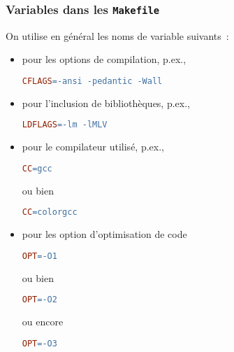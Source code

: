 \begin{frame}[fragile]
\frametitle{Variables dans les {\tt Makefile}}
On utilise en général les noms de variable suivants~:
\begin{itemize}
    \item {} pour les options de compilation, p.ex.,
\begin{lstlisting}[language=make,numbers=none,basicstyle=\footnotesize\tt]
CFLAGS=-ansi -pedantic -Wall
\end{lstlisting}

    \item {} pour l'inclusion de bibliothèques, p.ex.,
\begin{lstlisting}[language=make,numbers=none,basicstyle=\footnotesize\tt]
LDFLAGS=-lm -lMLV
\end{lstlisting}

    \item {} pour le compilateur utilisé, p.ex.,

\begin{minipage}[c]{.16\textwidth}
\begin{lstlisting}[language=make,numbers=none,basicstyle=\footnotesize\tt]
CC=gcc
\end{lstlisting}
\end{minipage}
ou bien \hspace{2.5em}
\begin{minipage}[c]{.16\textwidth}
\begin{lstlisting}[language=make,numbers=none,basicstyle=\footnotesize\tt]
CC=colorgcc
\end{lstlisting}
\end{minipage}

    \item {} pour les option d'optimisation de code

\begin{minipage}[c]{.16\textwidth}
\begin{lstlisting}[language=make,numbers=none,basicstyle=\footnotesize\tt]
OPT=-O1
\end{lstlisting}
\end{minipage}
ou bien \hspace{2.5em}
\begin{minipage}[c]{.16\textwidth}
\begin{lstlisting}[language=make,numbers=none,basicstyle=\footnotesize\tt]
OPT=-O2
\end{lstlisting}
\end{minipage}
ou encore \hspace{2.5em}
\begin{minipage}[c]{.16\textwidth}
\begin{lstlisting}[language=make,numbers=none,basicstyle=\footnotesize\tt]
OPT=-O3
\end{lstlisting}
\end{minipage}
\end{itemize}
\end{frame}

